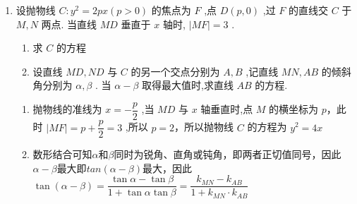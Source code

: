 \begin{enumerate}
\begin{jieda}
\begin{enumerate}
\begin{enumerate}
                设$P\left(\dfrac{(a+s)^2}{4}, a+s\right)$，$Q(-4, y_Q)$，故$\vv{AP} = \left(\dfrac{2as+s^2}{4}, s\right)$，$\vv{QA} = \left(\dfrac{a^2}{4}+3, a-y_Q\right)$

                根据$\vv{AP} // \vv{QA}$可知$(a-y_Q) = \dfrac{s \cdot \left(\dfrac{a^2}{4}+3\right)}{\dfrac{2as+s^2}{4}} = \dfrac{a^2+12}{2a+s}$

                故$|HQ| = a+s - y_Q = s+\dfrac{a^2+12}{2a+s} = (2a+s)+\dfrac{a^2+12}{2a+s} - 2a > 4$对$s \in (-a, 0) \cup (0, +\infty)$恒成立.

                $(2a+s)+\dfrac{a^2+12}{2a+s} - 2a \geq 2\sqrt{a^2+12}-2a$，当$2a+s = \sqrt{a^2+12}$时取等号

                综上所述: $a \in  (0,2\rbrack$ .
            \end{enumerate}

        \end{enumerate}
    \end{jieda}
    
    \item 设抛物线 $C : {y}^{2} = {2px}\left( {p > 0}\right)$ 的焦点为 $F$ ,点 $D\left( {p,0}\right)$ ,过 $F$ 的直线交 $C$ 于 $M,N$ 两点. 当直线 ${MD}$ 垂直于 $x$ 轴时, $\left| {MF}\right|  = 3$ .
    \begin{enumerate}
        \item 求 $C$ 的方程
        \item 设直线 ${MD},{ND}$ 与 $C$ 的另一个交点分别为 $A,B$ ,记直线 ${MN},{AB}$ 的倾斜角分别为 $\alpha ,\beta$ . 当 $\alpha  - \beta$ 取得最大值时,求直线 ${AB}$ 的方程.
    \end{enumerate}
    \begin{jieda}
        \begin{enumerate}
            \item 抛物线的准线为 $x =  - \dfrac{p}{2}$ ,当 ${MD}$ 与 $x$ 轴垂直时,点 $M$ 的横坐标为 $p$，此时 $\left| {MF}\right|  = p + \dfrac{p}{2} = 3$ ,所以 $p = 2$，所以抛物线 $C$ 的方程为 ${y}^{2} = {4x}$
            \item 
            数形结合可知$\alpha$和$\beta$同时为锐角、直角或钝角，即两者正切值同号，因此$\alpha - \beta$最大即$tan(\alpha - \beta)$最大，因此$\tan \left( {\alpha  - \beta }\right)  = \dfrac{\tan \alpha  - \tan \beta }{1 + \tan \alpha \tan \beta } = \dfrac{k_{MN}-k_{AB}}{1+k_{MN}\cdot k_{AB}}$
            

\end{enumerate}
\end{jieda}
\end{enumerate}
